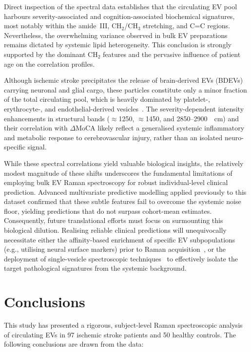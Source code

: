 \documentclass[preprint,12pt]{elsarticle}
\begin{document}
Direct inspection of the spectral data establishes that the circulating EV pool harbours severity-associated and cognition-associated biochemical signatures, most notably within the amide~III, CH$_2$/CH$_3$ stretching, and C=C regions. Nevertheless, the overwhelming variance observed in bulk EV preparations remains dictated by systemic lipid heterogeneity. This conclusion is strongly supported by the dominant CH$_2$ features and the pervasive influence of patient age on the correlation profiles.

Although ischemic stroke precipitates the release of brain-derived EVs (BDEVs) carrying neuronal and glial cargo, these particles constitute only a minor fraction of the total circulating pool, which is heavily dominated by platelet-, erythrocyte-, and endothelial-derived vesicles~\cite{liu2025}. The severity-dependent intensity enhancements in structural bands ($\approx$1250, $\approx$1450, and 2850--2900~\si{\per\centi\metre}) and their correlation with $\Delta$MoCA likely reflect a generalised systemic inflammatory and metabolic response to cerebrovascular injury, rather than an isolated neuro-specific signal.

While these spectral correlations yield valuable biological insights, the relatively modest magnitude of these shifts underscores the fundamental limitations of employing bulk EV Raman spectroscopy for robust individual-level clinical prediction. Advanced multivariate predictive modelling applied previously to this dataset confirmed that these subtle features fail to overcome the systemic noise floor, yielding predictions that do not surpass cohort-mean estimates. Consequently, future translational efforts must focus on surmounting this biological dilution. Realising reliable clinical predictions will unequivocally necessitate either the affinity-based enrichment of specific EV subpopulations (e.g., utilising neural surface markers) prior to Raman acquisition~\cite{liu2025}, or the deployment of single-vesicle spectroscopic techniques~\cite{jensen2024, koster2021} to effectively isolate the target pathological signatures from the systemic background.

\section{Conclusions}
\label{sec:conclusions}

This study has presented a rigorous, subject-level Raman spectroscopic analysis of circulating EVs in 97 ischemic stroke patients and 50 healthy controls. The following conclusions are drawn from the data:
\end{document}
